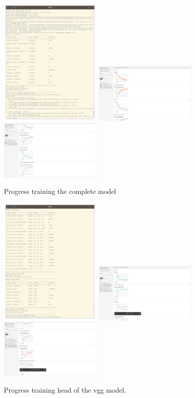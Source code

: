 \begin{figure}[h]
    \centering
    \includegraphics[width=5cm]{complete-parameters.png}
    \includegraphics[width=5cm]{complete-a.png}
    \includegraphics[width=5cm]{complete-b.png}
    \caption{Progress training the complete model}
    \label{fig:result1}
\end{figure}

\begin{figure}[h]
    \centering
    \includegraphics[width=5cm]{vgg-parameters.png}
    \includegraphics[width=5cm]{vgg-a.png}
    \includegraphics[width=5cm]{vgg-b.png}
    \caption{Progress training head of the vgg model.}
    \label{fig:result1}
\end{figure}

